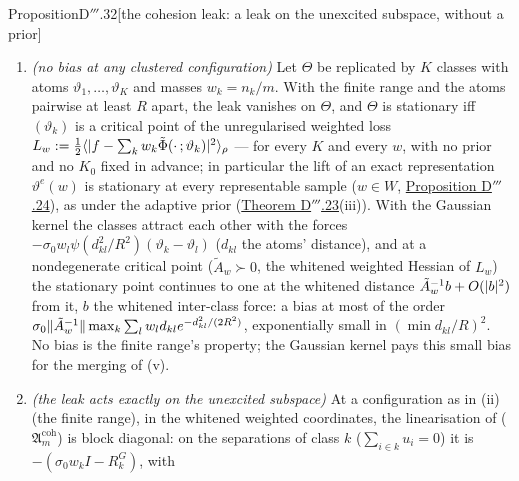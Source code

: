 \begin{thm}{Proposition}{D$'''$.32}[the cohesion leak: a leak on the unexcited subspace, without a
prior]
\begin{enumerate}[label=\textup{(\roman*)}]
    the modes of its own parameter distribution --- no prior, no atom count, no plan, no cells. The self-interaction
    vanishes ($\psi(0)\cdot0$), so the empirical measure of \textup{($\mathfrak{A}_m^{\mathrm{coh}}$)} solves the
    mean-field equation exactly, and Theorem D's finite-horizon propagation of chaos holds (the velocity field is
    Lipschitz in $\vartheta$ and in $\mu$ for $W_1$, Dobrushin's estimate). With the Gaussian kernel
    $J^{\mathrm{coh}}_m$ is real-analytic (the saturated network is), so every bounded solution converges to a single
    stationary point ({\L}ojasiewicz's theorem, as for Proposition D$'''$.20). The forces sum to zero: the leak is
    internal and gives no a-priori bound.
  \item \emph{(no bias at any clustered configuration)} Let $\Theta$ be replicated by $K$ classes with atoms
    $\vartheta_1,\dots,\vartheta_K$ and masses $w_k = n_k/m$. With the finite range and the atoms pairwise at least
    $R$ apart, the leak vanishes on $\Theta$, and $\Theta$ is stationary iff $(\vartheta_k)$ is a critical point of
    the unregularised weighted loss
    $L_w := \frac12\langle\lvert f - \sum_kw_k\tilde\Phi(\cdot\,;\vartheta_k)\rvert^2\rangle_\rho$ --- for every $K$ and every
    $w$, with no prior and no $K_0$ fixed in advance; in particular the lift of an exact representation
    $\vartheta^e(w)$ is stationary at every representable sample ($w\in W$,
    \hyperref[res:thmDppp:24]{Proposition D$'''$.24}), as under the adaptive prior
    (\hyperref[res:thmDppp:23]{Theorem D$'''$.23}(iii)). With the Gaussian kernel the classes attract each other with
    the forces $-\sigma_0w_l\psi(d^2_{kl}/R^2)(\vartheta_k - \vartheta_l)$ ($d_{kl}$ the atoms' distance), and at a
    nondegenerate critical point ($\tilde A_w\succ0$, the whitened weighted Hessian of $L_w$) the stationary point
    continues to one at the whitened distance $\tilde A_w^{-1}b + O(\lvert b\rvert^2)$ from it, $b$ the whitened inter-class
    force: a bias at most of the order
    $\sigma_0\lVert \tilde A_w^{-1}\rVert\max_k\sum_lw_ld_{kl}e^{-d^2_{kl}/(2R^2)}$, exponentially small in
    $(\min d_{kl}/R)^2$. No bias is the finite range's property; the Gaussian kernel pays this small bias for the
    merging of (v).
  \item \emph{(the leak acts exactly on the unexcited subspace)} At a configuration as in (ii) (the finite range), in
    the whitened weighted coordinates, the linearisation of \textup{($\mathfrak{A}_m^{\mathrm{coh}}$)} is block
    diagonal: on the separations of class $k$ ($\sum_{i\in k}u_i = 0$) it is $-(\sigma_0w_kI - R^G_k)$, with

\end{enumerate}
\end{thm}
